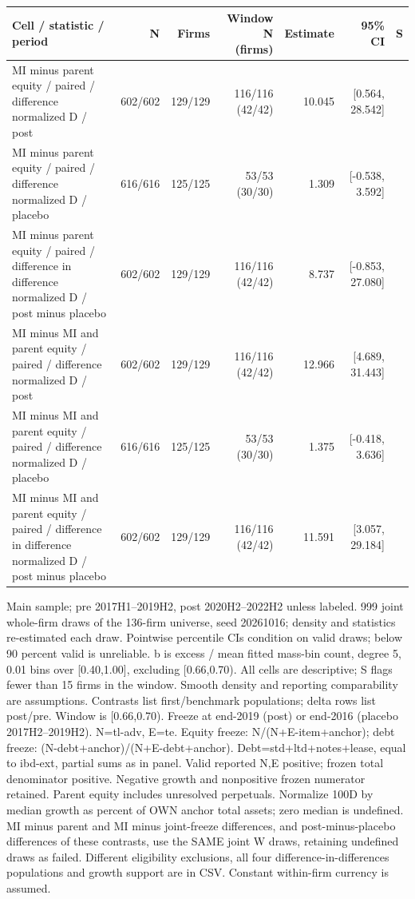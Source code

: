 \begin{threeparttable}
\begin{tabular}{p{5.7cm}rrrrrl}
\toprule
Cell / statistic / period & N & Firms & Window N (firms) & Estimate & 95\% CI & S \\
\midrule
MI minus parent equity / paired / difference normalized D / post & 602/602 & 129/129 & 116/116 (42/42) & 10.045 & [0.564, 28.542] &  \\
MI minus parent equity / paired / difference normalized D / placebo & 616/616 & 125/125 & 53/53 (30/30) & 1.309 & [-0.538, 3.592] &  \\
MI minus parent equity / paired / difference in difference normalized D / post minus placebo & 602/602 & 129/129 & 116/116 (42/42) & 8.737 & [-0.853, 27.080] &  \\
MI minus MI and parent equity / paired / difference normalized D / post & 602/602 & 129/129 & 116/116 (42/42) & 12.966 & [4.689, 31.443] &  \\
MI minus MI and parent equity / paired / difference normalized D / placebo & 616/616 & 125/125 & 53/53 (30/30) & 1.375 & [-0.418, 3.636] &  \\
MI minus MI and parent equity / paired / difference in difference normalized D / post minus placebo & 602/602 & 129/129 & 116/116 (42/42) & 11.591 & [3.057, 29.184] &  \\
\bottomrule
\end{tabular}
\begin{tablenotes}[flushleft]\footnotesize
\item[] Main sample; pre 2017H1--2019H2, post 2020H2--2022H2 unless labeled. 999 joint whole-firm draws of the 136-firm universe, seed 20261016; density and statistics re-estimated each draw. Pointwise percentile CIs condition on valid draws; below 90 percent valid is unreliable. b is excess / mean fitted mass-bin count, degree 5, 0.01 bins over [0.40,1.00], excluding [0.66,0.70). All cells are descriptive; S flags fewer than 15 firms in the window. Smooth density and reporting comparability are assumptions. Contrasts list first/benchmark populations; delta rows list post/pre. Window is [0.66,0.70). Freeze at end-2019 (post) or end-2016 (placebo 2017H2--2019H2). N=tl-adv, E=te. Equity freeze: N/(N+E-item+anchor); debt freeze: (N-debt+anchor)/(N+E-debt+anchor). Debt=std+ltd+notes+lease, equal to ibd-ext, partial sums as in panel. Valid reported N,E positive; frozen total denominator positive. Negative growth and nonpositive frozen numerator retained. Parent equity includes unresolved perpetuals. Normalize 100D by median growth as percent of OWN anchor total assets; zero median is undefined. MI minus parent and MI minus joint-freeze differences, and post-minus-placebo differences of these contrasts, use the SAME joint W draws, retaining undefined draws as failed. Different eligibility exclusions, all four difference-in-differences populations and growth support are in CSV. Constant within-firm currency is assumed.
\end{tablenotes}
\end{threeparttable}
\endgroup
\par\medskip
